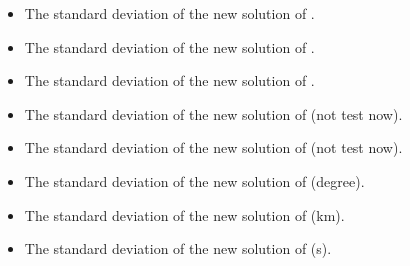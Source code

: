 \documentclass[a4paper,10pt,english,openany]{sphinxmanual}
\begin{document}
\begin{itemize}
\item {} 
The standard deviation of the new solution of .

\end{itemize}

\begin{itemize}
\item {} 
The standard deviation of the new solution of .

\end{itemize}

\begin{itemize}
\item {} 
The standard deviation of the new solution of .

\end{itemize}

\begin{itemize}
\item {} 
The standard deviation of the new solution of  (not test now).

\end{itemize}

\begin{itemize}
\item {} 
The standard deviation of the new solution of   (not test now).

\end{itemize}

\begin{itemize}
\item {} 
The standard deviation of the new solution of  (degree).

\end{itemize}

\begin{itemize}
\item {} 
The standard deviation of the new solution of  (km).

\end{itemize}

\begin{itemize}
\item {} 
The standard deviation of the new solution of  (s).

\end{itemize}
\end{document}
